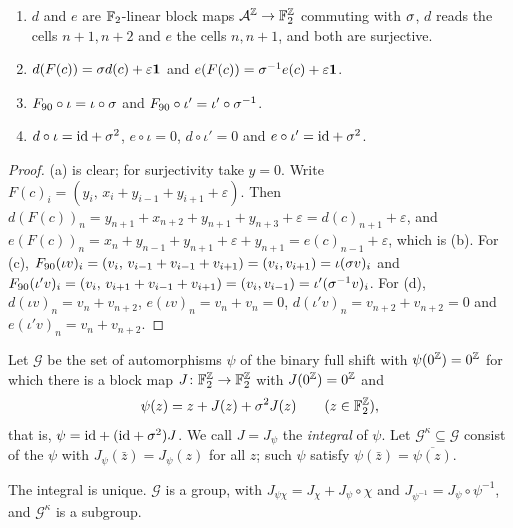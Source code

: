 \begin{lemma}\label{lin:coords}
\begin{enumerate}
\item[(a)] $d$ and $e$ are $\mathbb{F}_2$-linear block maps $\mathcal{A}^{\mathbb{Z}}\to\mathbb{F}_2^{\mathbb{Z}}$ commuting with $\sigma$, $d$ reads the cells $n+1,n+2$ and $e$ the cells $n,n+1$, and both are surjective.
\item[(b)] $d(F(c))=\sigma d(c)+\varepsilon\mathbf 1$ and $e(F(c))=\sigma^{-1}e(c)+\varepsilon\mathbf 1$.
\item[(c)] $F_{90}\circ\iota=\iota\circ\sigma$ and $F_{90}\circ\iota'=\iota'\circ\sigma^{-1}$.
\item[(d)] $d\circ\iota=\mathrm{id}+\sigma^2$, $e\circ\iota=0$, $d\circ\iota'=0$ and $e\circ\iota'=\mathrm{id}+\sigma^2$.
\end{enumerate}
\end{lemma}

\begin{proof}
(a) is clear; for surjectivity take $y=0$. Write $F(c)_i=(y_i,\,x_i+y_{i-1}+y_{i+1}+\varepsilon)$. Then $d(F(c))_n=y_{n+1}+x_{n+2}+y_{n+1}+y_{n+3}+\varepsilon=d(c)_{n+1}+\varepsilon$, and $e(F(c))_n=x_n+y_{n-1}+y_{n+1}+\varepsilon+y_{n+1}=e(c)_{n-1}+\varepsilon$, which is (b). For (c), $F_{90}(\iota v)_i=(v_i,\,v_{i-1}+v_{i-1}+v_{i+1})=(v_i,v_{i+1})=\iota(\sigma v)_i$ and $F_{90}(\iota'v)_i=(v_i,\,v_{i+1}+v_{i-1}+v_{i+1})=(v_i,v_{i-1})=\iota'(\sigma^{-1}v)_i$. For (d), $d(\iota v)_n=v_n+v_{n+2}$, $e(\iota v)_n=v_n+v_n=0$, $d(\iota'v)_n=v_{n+2}+v_{n+2}=0$ and $e(\iota'v)_n=v_n+v_{n+2}$.
\end{proof}

\begin{definition}\label{lin:def:integral}
Let $\mathcal G$ be the set of automorphisms $\psi$ of the binary full shift with $\psi(0^{\mathbb{Z}})=0^{\mathbb{Z}}$ for which there is a block map $J\colon\mathbb{F}_2^{\mathbb{Z}}\to\mathbb{F}_2^{\mathbb{Z}}$ with $J(0^{\mathbb{Z}})=0^{\mathbb{Z}}$ and
\[
\psi(z)=z+J(z)+\sigma^2J(z)\qquad(z\in\mathbb{F}_2^{\mathbb{Z}}),
\]
that is, $\psi=\mathrm{id}+(\mathrm{id}+\sigma^2)J$. We call $J=J_\psi$ the \emph{integral} of $\psi$. Let $\mathcal G^{\kappa}\subseteq\mathcal G$ consist of the $\psi$ with $J_\psi(\bar z)=J_\psi(z)$ for all $z$; such $\psi$ satisfy $\psi(\bar z)=\overline{\psi(z)}$.
\end{definition}

\begin{lemma}\label{lin:integral}
The integral is unique. $\mathcal G$ is a group, with $J_{\psi\chi}=J_\chi+J_\psi\circ\chi$ and $J_{\psi^{-1}}=J_\psi\circ\psi^{-1}$, and $\mathcal G^{\kappa}$ is a subgroup.
\end{lemma}

